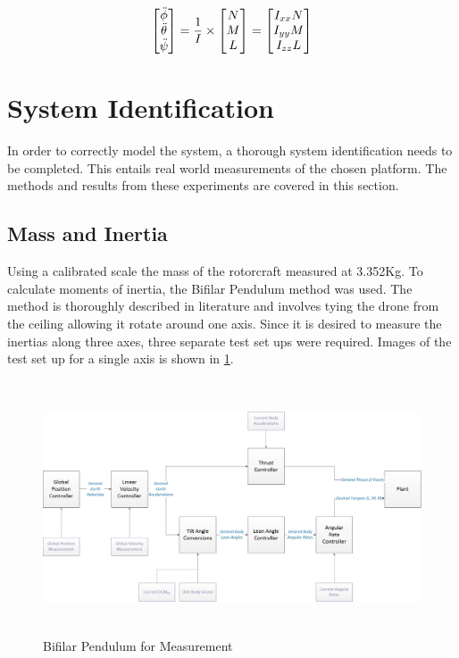 \begin{equation}
\begin{bmatrix}\ddot{\phi}\\ \ddot{\theta} \\ \ddot{\psi} \end{bmatrix} = \frac{1}{\boldmath{I}} \times \begin{bmatrix} N  \\ M  \\ L \end{bmatrix} = \begin{bmatrix} I_{xx} N  \\ I_{yy} M  \\ I_{zz} L \end{bmatrix}
\label{EQ_EulerNewtonRotationMatrix}
\end{equation}
	
\section{System Identification}
In order to correctly model the system, a thorough system identification needs to be completed. This entails real world measurements of the chosen platform. The methods and results from these experiments are covered in this section.

	\subsection{Mass and Inertia}
	Using a calibrated scale the mass of the rotorcraft measured at 3.352Kg. To calculate moments of inertia, the Bifilar Pendulum method was used. The method is thoroughly described in literature and involves tying the drone from the ceiling allowing it rotate around one axis. Since it is desired to measure the inertias along three axes, three separate test set ups were required. Images of the test set up for a single axis is shown in \ref{IM_BifilarPendulum}. 
	
	\begin{figure}[H]
		\centering
		\includegraphics[height = 7.5cm]{../References/Diagrams/ControlDiagram.jpg}
		\caption{Bifilar Pendulum for Measurement}
		\label{IM_BifilarPendulum}
	\end{figure}
	
